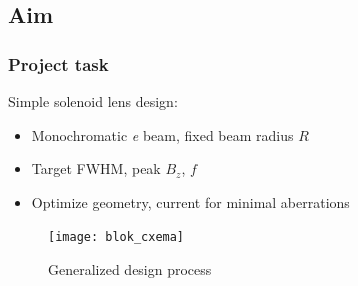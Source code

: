 \tocslide
\subsection{Aim}
\begin{frame}
  \rfn
  \frametitle{Project task}
  Simple solenoid lens design:
  \begin{itemize}
    \item Monochromatic \textit{e} beam, fixed beam radius $R$
    \item Target FWHM, peak $B_z$, $f$
    \item Optimize geometry, current for minimal aberrations
  \end{itemize}
  \begin{figure}
    \texttt{[image: blok\_cxema]}
    \caption{Generalized design process}
  \end{figure}
\end{frame}

